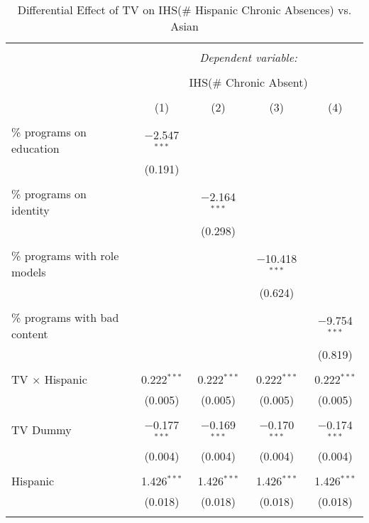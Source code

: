 
\begin{table}[!htbp] \centering 
  \caption{Differential Effect of TV on IHS(\# Hispanic Chronic Absences) vs. Asian} 
  \label{} 
\begin{tabular}{@{\extracolsep{-2pt}}lcccc} 
\\[-1.8ex]\hline 
\hline \\[-1.8ex] 
 & \multicolumn{4}{c}{\textit{Dependent variable:}} \\ 
\cline{2-5} 
\\[-1.8ex] & \multicolumn{4}{c}{IHS(\# Chronic Absent)} \\ 
\\[-1.8ex] & (1) & (2) & (3) & (4)\\ 
\hline \\[-1.8ex] 
 \% programs on education & $-$2.547$^{***}$ &  &  &  \\ 
  & (0.191) &  &  &  \\ 
  & & & & \\ 
 \% programs on identity &  & $-$2.164$^{***}$ &  &  \\ 
  &  & (0.298) &  &  \\ 
  & & & & \\ 
 \% programs with role models &  &  & $-$10.418$^{***}$ &  \\ 
  &  &  & (0.624) &  \\ 
  & & & & \\ 
 \% programs with bad content &  &  &  & $-$9.754$^{***}$ \\ 
  &  &  &  & (0.819) \\ 
  & & & & \\ 
 TV $\times$ Hispanic & 0.222$^{***}$ & 0.222$^{***}$ & 0.222$^{***}$ & 0.222$^{***}$ \\ 
  & (0.005) & (0.005) & (0.005) & (0.005) \\ 
  & & & & \\ 
 TV Dummy & $-$0.177$^{***}$ & $-$0.169$^{***}$ & $-$0.170$^{***}$ & $-$0.174$^{***}$ \\ 
  & (0.004) & (0.004) & (0.004) & (0.004) \\ 
  & & & & \\ 
 Hispanic & 1.426$^{***}$ & 1.426$^{***}$ & 1.426$^{***}$ & 1.426$^{***}$ \\ 
  & (0.018) & (0.018) & (0.018) & (0.018) \\ 
  & & & & \\ 

\end{tabular}
\end{table}

